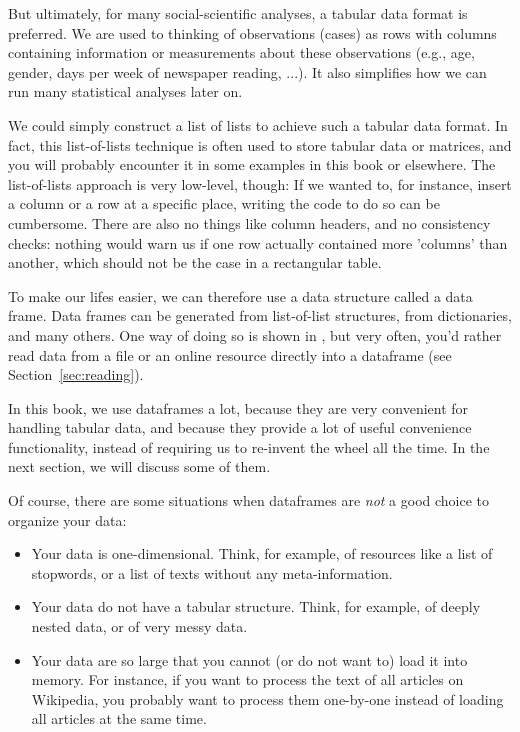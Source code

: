 But ultimately, for many social-scientific analyses, a tabular data format is preferred.
We are used to thinking of observations (cases) as rows with columns containing information or measurements about these observations (e.g., age, gender, days per week of newspaper reading, ...). It also simplifies how we can run many statistical analyses later on.

We could simply construct a list of lists to achieve such a tabular data format.
In fact, this list-of-lists technique is often used to store tabular data or matrices, and you will probably encounter it in some examples in this book or elsewhere. The list-of-lists approach is very low-level, though: If we wanted to, for instance, insert a column or a row at a specific place, writing the code to do so can be cumbersome. There are also no things like column headers, and no consistency checks: nothing would warn us if one row actually contained more 'columns' than another, which should not be the case in a rectangular table.

To make our lifes easier, we can therefore use a data structure called a data frame. 
Data frames can be generated from list-of-list structures, from dictionaries, and many others.
One way of doing so is shown in , but very often, you'd rather read data from a file or an online resource directly into a dataframe (see Section~\ref{sec:reading}).


In this book, we use dataframes a lot, because they are very convenient for handling tabular data, and because they provide a lot of useful convenience functionality, instead of requiring us to re-invent the wheel all the time. In the next section, we will discuss some of them.

Of course, there are some situations when dataframes are \emph{not} a good choice to organize your data:
\begin{itemize}
\item Your data is one-dimensional. Think, for example, of resources like a list of stopwords, or a list of texts without any meta-information.
\item Your data do not have a tabular structure. Think, for example, of deeply nested data, or of very messy data.
\item Your data are so large that you cannot (or do not want to) load it into memory. For instance, if you want to process the text of all articles on Wikipedia, you probably want to process them one-by-one instead of loading all articles at the same time.
\end{itemize}

